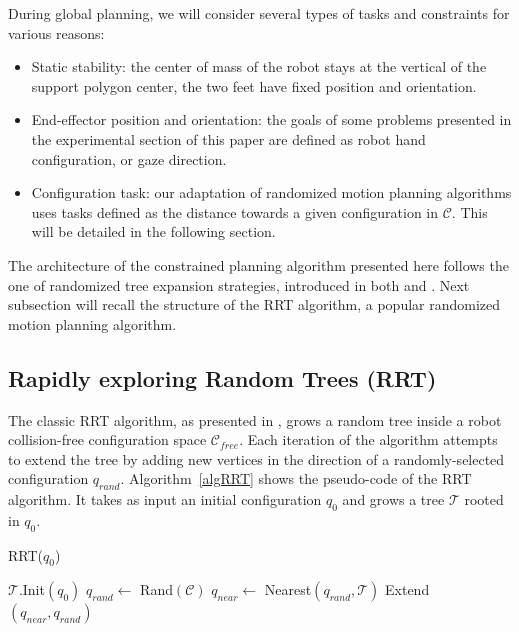 \documentclass{article}
\begin{document}
During global planning, we will consider several types of
tasks and constraints for various reasons:
\begin{itemize}
\item  Static stability: the center of mass of the robot stays at
  the vertical of the support polygon center, the two feet have fixed position and
  orientation.
\item End-effector position and orientation: the goals of some problems presented
  in the experimental section of this paper are defined as robot hand configuration,
  or gaze direction.
\item Configuration task: our adaptation of randomized motion planning algorithms 
  uses tasks defined as the distance towards a given configuration in $\mathcal{C}$. 
  This will be detailed in the following section.
\end{itemize}


The architecture of the constrained planning algorithm presented here follows
the one of randomized tree expansion strategies, introduced in both \cite{HsuLat99c} and
\cite{kuffner00rrtconnect}. Next subsection will recall the structure of the RRT algorithm,
a popular randomized motion planning algorithm.


\subsection{Rapidly exploring Random Trees (RRT)}

The classic RRT algorithm, as presented in  \cite{kuffner00rrtconnect}, grows 
a random tree inside a robot 
collision-free configuration space 
$\mathcal{C}_{free}$. Each iteration of the algorithm attempts to extend the tree
by adding new vertices in the direction of a randomly-selected configuration
$q_{rand}$. Algorithm~\ref{algRRT} shows the pseudo-code of the RRT algorithm.
It takes as input an initial configuration $q_0$ and grows a tree  $\mathcal{T}$ rooted 
in $q_0$. 

\begin{algorithm}
\caption{RRT($q_0$)}
\label{algRRT}
\begin{algorithmic}
\STATE $\mathcal{T}.$Init$(q_0)$
\STATE $q_{rand} \leftarrow $ Rand$(\mathcal{C})$
\STATE $q_{near} \leftarrow $ Nearest$(q_{rand},\mathcal{T})$
\STATE Extend$(q_{near},q_{rand})$
\ENDFOR

\end{algorithmic}
\end{algorithm}
\end{document}

